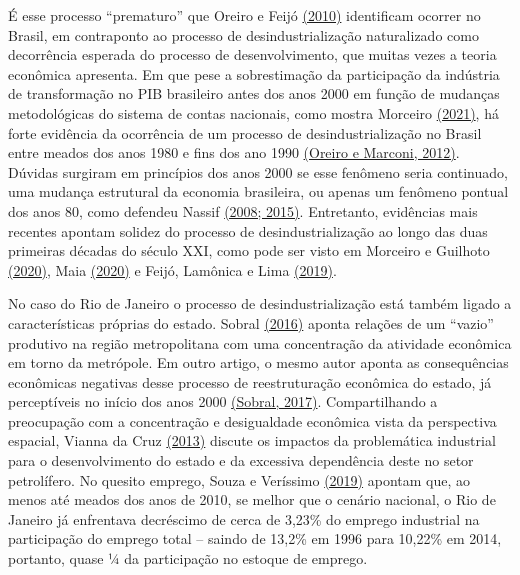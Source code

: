 É esse processo ``prematuro'' que Oreiro e Feijó
\href{https://www.zotero.org/google-docs/?hrJ4AN}{(2010)} identificam
ocorrer no Brasil, em contraponto ao processo de desindustrialização
naturalizado como decorrência esperada do processo de desenvolvimento,
que muitas vezes a teoria econômica apresenta. Em que pese a
sobrestimação da participação da indústria de transformação no PIB
brasileiro antes dos anos 2000 em função de mudanças metodológicas do
sistema de contas nacionais, como mostra Morceiro
\href{https://www.zotero.org/google-docs/?yaPvp0}{(2021)}, há forte
evidência da ocorrência de um processo de desindustrialização no Brasil
entre meados dos anos 1980 e fins dos ano 1990
\href{https://www.zotero.org/google-docs/?EpdASN}{(Oreiro e Marconi,
2012)}. Dúvidas surgiram em princípios dos anos 2000 se esse fenômeno
seria continuado, uma mudança estrutural da economia brasileira, ou
apenas um fenômeno pontual dos anos 80, como defendeu Nassif
\href{https://www.zotero.org/google-docs/?Lcq024}{(2008; 2015)}.
Entretanto, evidências mais recentes apontam solidez do processo de
desindustrialização ao longo das duas primeiras décadas do século XXI,
como pode ser visto em Morceiro e Guilhoto
\href{https://www.zotero.org/google-docs/?GHtpZP}{(2020)}, Maia
\href{https://www.zotero.org/google-docs/?aTAxBm}{(2020)} e Feijó,
Lamônica e Lima
\href{https://www.zotero.org/google-docs/?1SorMi}{(2019)}.

No caso do Rio de Janeiro o processo de desindustrialização está também
ligado a características próprias do estado. Sobral
\href{https://www.zotero.org/google-docs/?zV6TKb}{(2016)} aponta
relações de um ``vazio'' produtivo na região metropolitana com uma
concentração da atividade econômica em torno da metrópole. Em outro
artigo, o mesmo autor aponta as consequências econômicas negativas desse
processo de reestruturação econômica do estado, já perceptíveis no
início dos anos 2000
\href{https://www.zotero.org/google-docs/?cnRPuc}{(Sobral, 2017)}.
Compartilhando a preocupação com a concentração e desigualdade econômica
vista da perspectiva espacial, Vianna da Cruz
\href{https://www.zotero.org/google-docs/?gibX7I}{(2013)} discute os
impactos da problemática industrial para o desenvolvimento do estado e
da excessiva dependência deste no setor petrolífero. No quesito emprego,
Souza e Veríssimo
\href{https://www.zotero.org/google-docs/?oj5qly}{(2019)} apontam que,
ao menos até meados dos anos de 2010, se melhor que o cenário nacional,
o Rio de Janeiro já enfrentava decréscimo de cerca de 3,23\% do emprego
industrial na participação do emprego total -- saindo de 13,2\% em 1996
para 10,22\% em 2014, portanto, quase ¼ da participação no estoque de
emprego.

